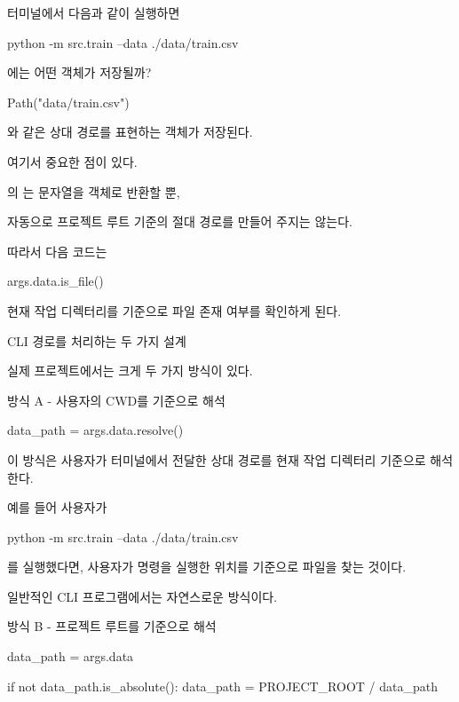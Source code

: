터미널에서 다음과 같이 실행하면

\begin{dhkzsh}
python -m src.train --data ./data/train.csv
\end{dhkzsh}

에는 어떤 객체가 저장될까?

\begin{dhkcode}
Path("data/train.csv")
\end{dhkcode}

와 같은 상대 경로를 표현하는  객체가 저장된다.

여기서 중요한 점이 있다.

의 는 문자열을  객체로 반환할 뿐,

자동으로 프로젝트 루트 기준의 절대 경로를 만들어 주지는 않는다.

따라서 다음 코드는

\begin{dhkcode}
args.data.is_file()
\end{dhkcode}

현재 작업 디렉터리를 기준으로 파일 존재 여부를 확인하게 된다.

\begin{dhknote}
\begin{dhksmry}[centered]
CLI 경로를 처리하는 두 가지 설계
\end{dhksmry}
\end{dhknote}

실제 프로젝트에서는 크게 두 가지 방식이 있다.

방식 A - 사용자의 CWD를 기준으로 해석

\begin{dhkcode}
data_path = args.data.resolve()
\end{dhkcode}

이 방식은 사용자가 터미널에서 전달한 상대 경로를 현재 작업 디렉터리 기준으로 해석한다.

예를 들어 사용자가

\begin{dhkzsh}
python -m src.train --data ./data/train.csv
\end{dhkzsh}

를 실행했다면, 사용자가 명령을 실행한 위치를 기준으로 파일을 찾는 것이다.

일반적인 CLI 프로그램에서는 자연스로운 방식이다.

방식 B - 프로젝트 루트를 기준으로 해석

\begin{dhkcode}
data_path = args.data

if not data_path.is_absolute():
    data_path = PROJECT_ROOT / data_path
\end{dhkcode}

